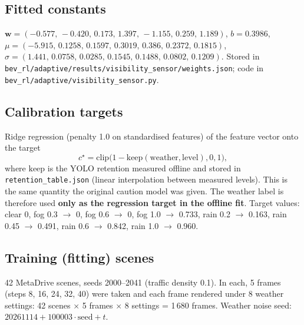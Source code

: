 \documentclass[11pt,a4paper]{article}
\begin{document}
\subsection{Fitted constants}
$\mathbf w=(-0.577,\,-0.420,\,0.173,\,1.397,\,-1.155,\,0.259,\,1.189)$, $b=0.3986$, $\mu=(-5.915,\,0.1258,\,0.1597,\,0.3019,\,0.386,\,0.2372,\,0.1815)$, $\sigma=(1.441,\,0.0758,\,0.0285,\,0.1545,\,0.1488,\,0.0802,\,0.1209)$. Stored in \texttt{bev\_rl/adaptive/results/visibility\_sensor/weights.json}; code in \texttt{bev\_rl/adaptive/visibility\_sensor.py}.

\subsection{Calibration targets}
Ridge regression (penalty 1.0 on standardised features) of the feature vector onto the target
\[ c^{\star}=\mathrm{clip}\big(1-\mathrm{keep}(\text{weather},\text{level}),0,1\big), \]
where $\mathrm{keep}$ is the YOLO retention measured offline and stored in \texttt{retention\_table.json} (linear interpolation between measured levels). This is the same quantity the original caution model was given. The weather label is therefore used \textbf{only as the regression target in the offline fit}. Target values: clear 0, fog 0.3 $\to$ 0, fog 0.6 $\to$ 0, fog 1.0 $\to$ 0.733, rain 0.2 $\to$ 0.163, rain 0.45 $\to$ 0.491, rain 0.6 $\to$ 0.842, rain 1.0 $\to$ 0.960.

\subsection{Training (fitting) scenes}
42 MetaDrive scenes, seeds 2000--2041 (traffic density 0.1). In each, 5 frames (steps 8, 16, 24, 32, 40) were taken and each frame rendered under 8 weather settings: 42 scenes $\times$ 5 frames $\times$ 8 settings = 1\,680 frames. Weather noise seed: $20261114+100003\cdot\text{seed}+t$.
\end{document}
